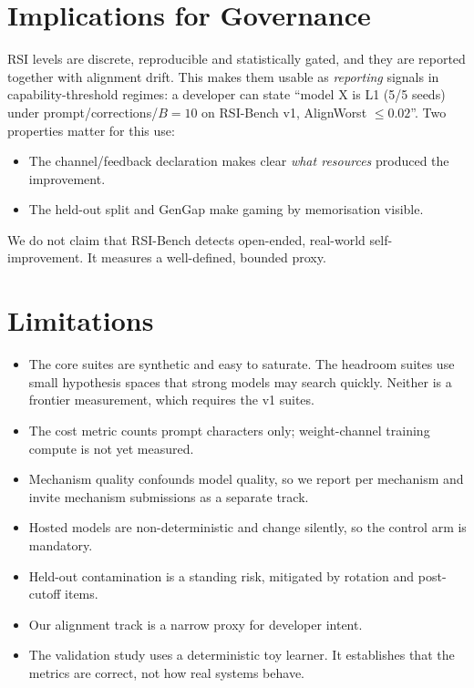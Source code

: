 \documentclass[11pt]{article}
\begin{document}
\section{Implications for Governance}

RSI levels are discrete, reproducible and statistically gated, and they are reported together with alignment drift. This makes them usable as \emph{reporting} signals in capability-threshold regimes: a developer can state ``model X is L1 (5/5 seeds) under prompt/corrections/$B{=}10$ on RSI-Bench v1, AlignWorst $\le 0.02$''. Two properties matter for this use:
\begin{itemize}
  \item The channel/feedback declaration makes clear \emph{what resources} produced the improvement.
  \item The held-out split and GenGap make gaming by memorisation visible.
\end{itemize}
We do not claim that RSI-Bench detects open-ended, real-world self-improvement. It measures a well-defined, bounded proxy.

\section{Limitations}

\begin{itemize}
  \item The core suites are synthetic and easy to saturate. The headroom suites use small hypothesis spaces that strong models may search quickly. Neither is a frontier measurement, which requires the v1 suites.
  \item The cost metric counts prompt characters only; weight-channel training compute is not yet measured.
  \item Mechanism quality confounds model quality, so we report per mechanism and invite mechanism submissions as a separate track.
  \item Hosted models are non-deterministic and change silently, so the control arm is mandatory.
  \item Held-out contamination is a standing risk, mitigated by rotation and post-cutoff items.
  \item Our alignment track is a narrow proxy for developer intent.
  \item The validation study uses a deterministic toy learner. It establishes that the metrics are correct, not how real systems behave.
\end{itemize}
\end{document}

